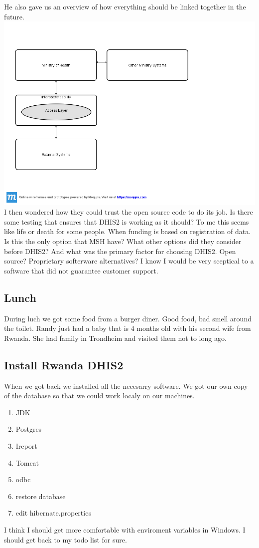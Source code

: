 He also gave us an overview of how everything should be linked together in the future.\\
\includegraphics[width=15cm]{appendix/images/future_design_rwanda}\\
I then wondered how they could trust the open source code to do its job. Is there some testing that ensures that DHIS2 is working as it should? To me this seems like life or death for some people. When funding is based on registration of data. Is this the only option that MSH have? What other options did they consider before DHIS2? And what was the primary factor for choosing DHIS2. Open source? Proprietary softerware alternatives? I know I would be very sceptical to a software that did not guarantee customer support. 
\subsection{Lunch}
During luch we got some food from a burger diner. Good food, bad smell around the toilet. Randy just had a baby that is 4 months old with his second wife from Rwanda. She had family in Trondheim and visited them not to long ago. 
\subsection{Install Rwanda DHIS2}
When we got back we installed all the necesarry software. We got our own copy of the database so that we could work localy on our machines.
\begin{enumerate}
\item JDK
\item Postgres
\item Ireport
\item Tomcat
\item odbc
\item restore database
\item edit hibernate.properties
\end{enumerate}
I think I should get more comfortable with enviroment variables in Windows. 
I should get back to my todo list for sure.

